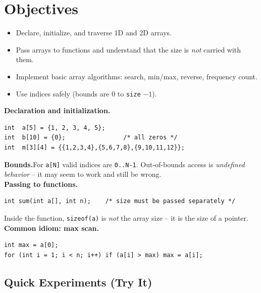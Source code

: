 \documentclass[11pt]{article}
\begin{document}
\labheader

\section*{Objectives}
\begin{itemize}[leftmargin=*,nosep]
  \item Declare, initialize, and traverse 1D and 2D arrays.
  \item Pass arrays to functions and understand that the size is \emph{not} carried with them.
  \item Implement basic array algorithms: search, min/max, reverse, frequency count.
  \item Use indices safely (bounds are 0 to \texttt{size} $-1$).
\end{itemize}

\begin{summary}
\textbf{Declaration and initialization.}
\begin{lstlisting}
int  a[5] = {1, 2, 3, 4, 5};
int  b[10] = {0};                /* all zeros */
int  m[3][4] = {{1,2,3,4},{5,6,7,8},{9,10,11,12}};
\end{lstlisting}

\textbf{Bounds.}\quad For \texttt{a[N]} valid indices are \texttt{0..N-1}.
Out-of-bounds access is \emph{undefined behavior} -- it may seem to work and still be wrong.\\
\textbf{Passing to functions.}\quad
\begin{lstlisting}
int sum(int a[], int n);    /* size must be passed separately */
\end{lstlisting}
Inside the function, \texttt{sizeof(a)} is \emph{not} the array size -- it is the size of a pointer.\\
\textbf{Common idiom: max scan.}
\begin{lstlisting}
int max = a[0];
for (int i = 1; i < n; i++) if (a[i] > max) max = a[i];
\end{lstlisting}
\end{summary}

\subsection*{Quick Experiments (Try It)}
\end{document}
